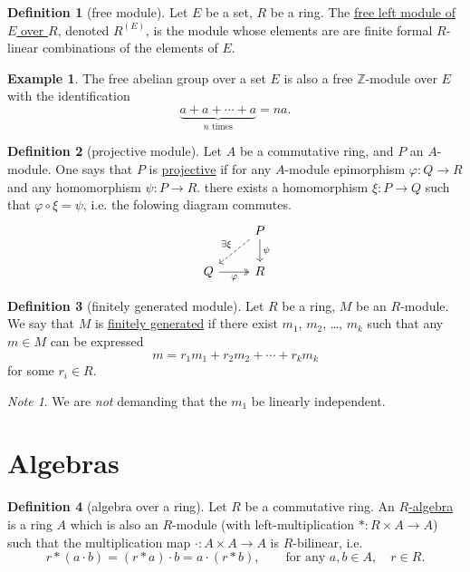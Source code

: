 \documentclass[a4paper]{report}
\newcommand{\Z}{\mathbb{Z}}
\newcommand{\defn}[1]{\ul{#1}}
\theoremstyle{definition}
\newtheorem{definition}{Definition}[section]
\newtheorem{example}{Example}[section]
\theoremstyle{plain}
\theoremstyle{remark}
\newtheorem{note}{Note}[section]
\begin{document}
\begin{definition}[free module]
  \label{def:freemodule}
  Let $E$ be a set, $R$ be a ring. The \defn{free left module of $E$ over $R$}, denoted $R^{(E)}$, is the module whose elements are are finite formal $R$-linear combinations of the elements of $E$.
\end{definition}

\begin{example}
  The free abelian group over a set $E$ is also a free $\Z$-module over $E$ with the identification
  \begin{equation*}
    \underbrace{a + a + \cdots + a}_{n\text{ times}} = na.
  \end{equation*}
\end{example}

\begin{definition}[projective module]
  \label{def:projectivemodule}
  Let $A$ be a commutative ring, and $P$ an $A$-module. One says that $P$ is \defn{projective} if for any $A$-module epimorphism $\varphi\colon Q \to R$ and any homomorphism $\psi\colon P \to R$. there exists a homomorphism $\xi\colon P \to Q$ such that $\varphi \circ \xi = \psi$, i.e. the folowing diagram commutes.
  \begin{equation*}
    \begin{tikzcd}
      & P
      \arrow[dl, swap, dashed, "\exists\xi"]
      \arrow[d, "\psi"]
      \\
      Q \arrow[r, swap, twoheadrightarrow, "\varphi"]
      & R
    \end{tikzcd}
  \end{equation*}
\end{definition}

\begin{definition}[finitely generated module]
  \label{def:finitelygeneratedmodule}
  Let $R$ be a ring, $M$ be an $R$-module. We say that $M$ is \defn{finitely generated} if there exist $m_{1}$, $m_{2}$, \dots, $m_{k}$ such that any $m \in M$ can be expressed 
  \begin{equation*}
    m = r_{1} m_{1} + r_{2} m_{2} + \cdots + r_{k} m_k
  \end{equation*}
  for some $r_{i} \in R$.
\end{definition}
\begin{note}
  We are \emph{not} demanding that the $m_{1}$ be linearly independent.
\end{note}

\section{Algebras}
\begin{definition}[algebra over a ring]
  \label{def:algebraoveraring}
  Let $R$ be a commutative ring. An \defn{$R$-algebra} is a ring $A$ which is also an $R$-module (with left-multiplication $*\colon R \times A \to A$) such that the multiplication map $\cdot\colon A \times A \to A$ is $R$-bilinear, i.e. 
  \begin{equation*}
    r*(a\cdot b) = (r*a)\cdot b = a\cdot (r*b),\qquad\text{for any }a,b \in A,\quad r \in R.
  \end{equation*}
\end{definition}
\end{document}
